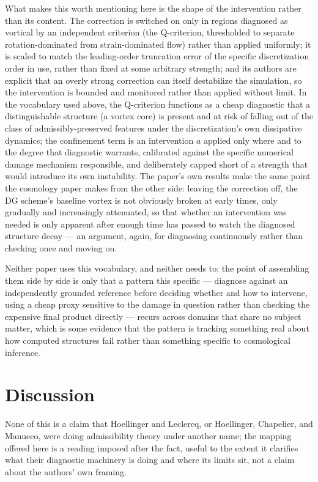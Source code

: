 \documentclass[11pt]{article}
\begin{document}
What makes this worth mentioning here is the shape of the intervention rather than its content. The correction is switched on only in regions diagnosed as vortical by an independent criterion (the Q-criterion, thresholded to separate rotation-dominated from strain-dominated flow) rather than applied uniformly; it is scaled to match the leading-order truncation error of the specific discretization order in use, rather than fixed at some arbitrary strength; and its authors are explicit that an overly strong correction can itself destabilize the simulation, so the intervention is bounded and monitored rather than applied without limit. In the vocabulary used above, the Q-criterion functions as a cheap diagnostic that a distinguishable structure (a vortex core) is present and at risk of falling out of the class of admissibly-preserved features under the discretization's own dissipative dynamics; the confinement term is an intervention $a$ applied only where and to the degree that diagnostic warrants, calibrated against the specific numerical damage mechanism responsible, and deliberately capped short of a strength that would introduce its own instability. The paper's own results make the same point the cosmology paper makes from the other side: leaving the correction off, the DG scheme's baseline vortex is not obviously broken at early times, only gradually and increasingly attenuated, so that whether an intervention was needed is only apparent after enough time has passed to watch the diagnosed structure decay --- an argument, again, for diagnosing continuously rather than checking once and moving on.

Neither paper uses this vocabulary, and neither needs to; the point of assembling them side by side is only that a pattern this specific --- diagnose against an independently grounded reference before deciding whether and how to intervene, using a cheap proxy sensitive to the damage in question rather than checking the expensive final product directly --- recurs across domains that share no subject matter, which is some evidence that the pattern is tracking something real about how computed structures fail rather than something specific to cosmological inference.

\section{Discussion}

None of this is a claim that Hoellinger and Leclercq, or Hoellinger, Chapelier, and Manueco, were doing admissibility theory under another name; the mapping offered here is a reading imposed after the fact, useful to the extent it clarifies what their diagnostic machinery is doing and where its limits sit, not a claim about the authors' own framing. 
\end{document}
